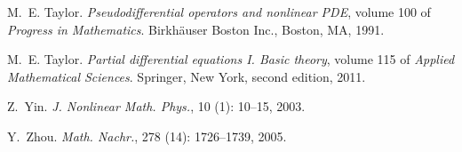 \documentclass[final]{thesis}
\begin{document}
\begin{thebibliography}{35}
M.~E. Taylor.
\newblock \emph{Pseudodifferential operators and nonlinear {PDE}}, volume 100
  of \emph{Progress in Mathematics}.
\newblock Birkh{\"a}user Boston Inc., Boston, MA, 1991.

M.~E. Taylor.
\newblock \emph{Partial differential equations {I}. {B}asic theory}, volume 115
  of \emph{Applied Mathematical Sciences}.
\newblock Springer, New York, second edition, 2011.

Z.~Yin.
\newblock \emph{J. Nonlinear Math. Phys.}, 10 (1): 10--15,
  2003.

Y.~Zhou.
\newblock \emph{Math. Nachr.}, 278 (14): 1726--1739, 2005.

\end{thebibliography}
%
%
\end{document}
